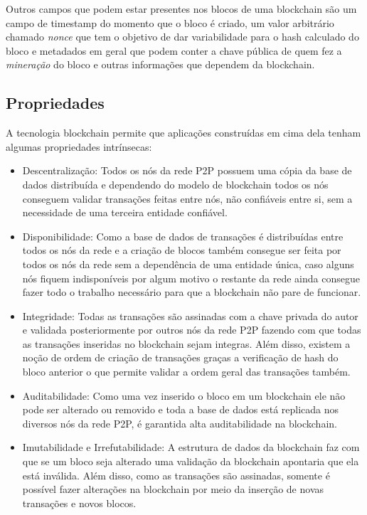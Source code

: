 \documentclass[12pt]{article}
\begin{document}
Outros campos que podem estar presentes nos blocos de uma blockchain são um campo de timestamp do momento que o bloco é criado, um valor arbitrário chamado \textit{nonce} que tem o objetivo de dar variabilidade para o hash calculado do bloco e metadados em geral que podem conter a chave pública de quem fez a \emph{mineração} do bloco e outras informações que dependem da blockchain\cite{miers2019analise}.

\subsection{Propriedades}

A tecnologia blockchain permite que aplicações construídas em cima dela tenham algumas propriedades intrínsecas:
\begin{itemize}
    \item Descentralização: Todos os nós da rede P2P possuem uma cópia da base de dados distribuída e dependendo do modelo de blockchain todos os nós conseguem validar transações feitas entre nós, não confiáveis entre si, sem a necessidade de uma terceira entidade confiável.
    \item Disponibilidade: Como a base de dados de transações é distribuídas entre todos os nós da rede e a criação de blocos também consegue ser feita por todos os nós da rede sem a dependência de uma entidade única, caso alguns nós fiquem indisponíveis por algum motivo o restante da rede ainda consegue fazer todo o trabalho necessário para que a blockchain não pare de funcionar.
    \item Integridade: Todas as transações são assinadas com a chave privada do autor e validada posteriormente por outros nós da rede P2P fazendo com que todas as transações inseridas no blockchain sejam integras. Além disso, existem a noção de ordem de criação de transações graças a verificação de hash do bloco anterior o que permite validar a ordem geral das transações também.
    \item Auditabilidade: Como uma vez inserido o bloco em um blockchain ele não pode ser alterado ou removido e toda a base de dados está replicada nos diversos nós da rede P2P, é garantida alta auditabilidade na blockchain.
    \item Imutabilidade e Irrefutabilidade: A estrutura de dados da blockchain faz com que se um bloco seja alterado uma validação da blockchain apontaria que ela está inválida. Além disso, como as transações são assinadas, somente é possível fazer alterações na blockchain por meio da inserção de novas transações e novos blocos.
\end{itemize}
\end{document}

